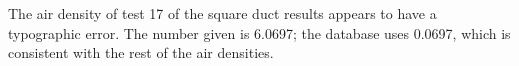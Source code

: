 The air density of test 17 of the square duct results appears to have a
typographic error.  The number given is 6.0697; the database uses 0.0697, which
is consistent with the rest of the air densities.
